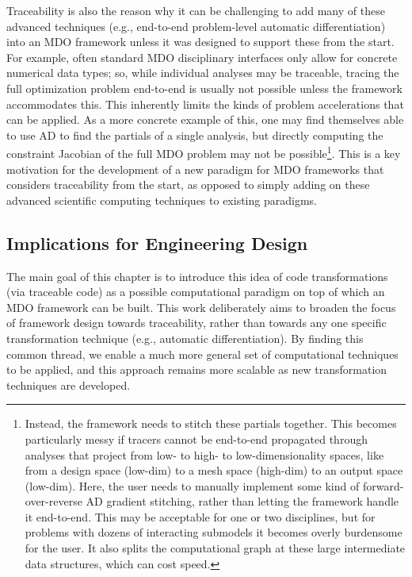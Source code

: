 Traceability is also the reason why it can be challenging to add many of these advanced techniques (e.g., end-to-end problem-level automatic differentiation) into an MDO framework unless it was designed to support these from the start. For example, often standard MDO disciplinary interfaces only allow for concrete numerical data types; so, while individual analyses may be traceable, tracing the full optimization problem end-to-end is usually not possible unless the framework accommodates this. This inherently limits the kinds of problem accelerations that can be applied. As a more concrete example of this, one may find themselves able to use AD to find the partials of a single analysis, but directly computing the constraint Jacobian of the full MDO problem may not be possible\footnote{Instead, the framework needs to stitch these partials together. This becomes particularly messy if tracers cannot be end-to-end propagated through analyses that project from low- to high- to low-dimensionality spaces, like from a design space (low-dim) to a mesh space (high-dim) to an output space (low-dim). Here, the user needs to manually implement some kind of forward-over-reverse AD gradient stitching, rather than letting the framework handle it end-to-end. This may be acceptable for one or two disciplines, but for problems with dozens of interacting submodels it becomes overly burdensome for the user. It also splits the computational graph at these large intermediate data structures, which can cost speed.}. This is a key motivation for the development of a new paradigm for MDO frameworks that considers traceability from the start, as opposed to simply adding on these advanced scientific computing techniques to existing paradigms.

\subsection{Implications for Engineering Design}

The main goal of this chapter is to introduce this idea of code transformations (via traceable code) as a possible computational paradigm on top of which an MDO framework can be built. This work deliberately aims to broaden the focus of framework design towards traceability, rather than towards any one specific transformation technique (e.g., automatic differentiation). By finding this common thread, we enable a much more general set of computational techniques to be applied, and this approach remains more scalable as new transformation techniques are developed.

